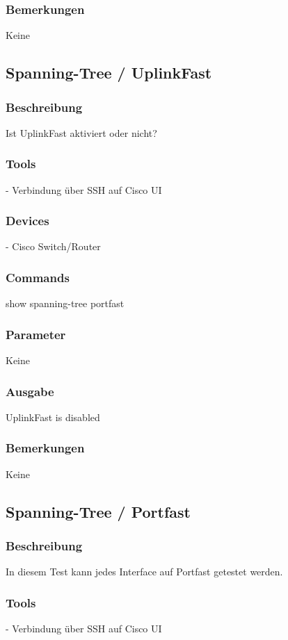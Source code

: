 \documentclass[a4,12pt]{scrartcl}
\begin{document}
\subsubsection{Bemerkungen}
Keine


\subsection{Spanning-Tree / UplinkFast}
\subsubsection{Beschreibung}
Ist UplinkFast aktiviert oder nicht?
\subsubsection{Tools}
- Verbindung über SSH auf Cisco UI 
\subsubsection{Devices}
- Cisco Switch/Router
\subsubsection{Commands}
show spanning-tree portfast
\subsubsection{Parameter}
Keine
\subsubsection{Ausgabe}
UplinkFast is disabled
\subsubsection{Bemerkungen}
Keine


\subsection{Spanning-Tree / Portfast}
\subsubsection{Beschreibung}
In diesem Test kann jedes Interface auf Portfast getestet werden.
\subsubsection{Tools}
- Verbindung über SSH auf Cisco UI 
\end{document}
